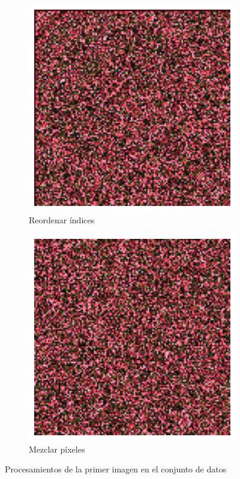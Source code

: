 \documentclass{article}
\begin{document}
\begin{figure}
  \centering
	\begin{subfigure}[b]{0.24\textwidth}
		\includegraphics[width= \textwidth]{alea1}
		\caption{Reordenar índices}
		\label{fg:alea1}
	\end{subfigure}
	\begin{subfigure}[b]{0.24\textwidth}
		\includegraphics[width= \textwidth]{alea2}
		\caption{Mezclar píxeles}
		\label{fg:alea2}
	\end{subfigure}
	\caption{Procesamientos de la primer imagen en el conjunto de datos}
\end{figure}
\end{document}
